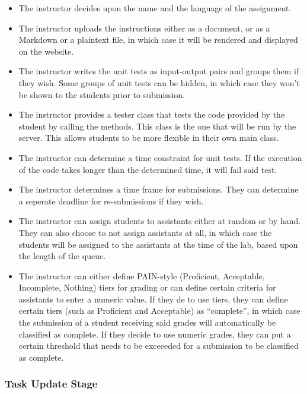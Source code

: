 \documentclass[a4paper, 12pt]{article}
\begin{document}
    \begin{itemize}
        \item The instructor decides upon the name and the language of the assignment.
        \item The instructor uploads the instructions either as a document, or as a Markdown
          or a plaintext file, in which case it will be rendered and displayed on the website.
        \item The instructor writes the unit tests as input-output pairs and groups them if
          they wish. Some groups of unit tests can be hidden, in which case they won't be
          shown to the students prior to submission.
        \item The instructor provides a tester class that tests the code provided by the student
        by calling the methods. This class is the one that will be run by the server. This allows students
        to be more flexible in their own main class.
        \item The instructor can determine a time constraint for unit tests. If the execution
          of the code takes longer than the determined time, it will fail said test.
        \item The instructor determines a time frame for submissions. They can determine a
          seperate deadline for re-submissions if they wish.
        \item The instructor can assign students to assistants either at random or by hand.
          They can also choose to not assign assistants at all, in which case the students
          will be assigned to the assistants at the time of the lab, based upon the length
          of the queue.
        \item The instructor can either define PAIN-style (Proficient, Acceptable, Incomplete, Nothing)
          tiers for grading or can define certain criteria for assistants to enter a numeric value. If they
          de to use tiers, they can define certain tiers (such as Proficient and Acceptable) as ``complete'',
          in which case the submission of a student receiving said grades will automatically be classified as complete.
          If they decide to use numeric grades, they can put a certain threshold that needs to be exceeeded for a
          submission to be classified as complete.
    \end{itemize}

    \subsubsection{Task Update Stage}
\end{document}
